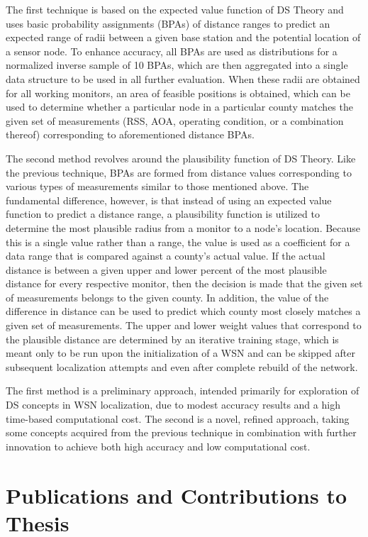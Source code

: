 \documentclass[12pt]{uthesis-v12}  %
\begin{document}
The first technique is based on the expected value function of DS Theory and uses basic probability assignments (BPAs) of distance ranges to predict an expected range of radii between a given base station and the potential location of a sensor node. To enhance accuracy, all BPAs are used as distributions for a normalized inverse sample of 10 BPAs, which are then aggregated into a single data structure to be used in all further evaluation. When these radii are obtained for all working monitors, an area of feasible positions is obtained, which can be used to determine whether a particular node in a particular county matches the given set of measurements (RSS, AOA, operating condition, or a combination thereof) corresponding to aforementioned distance BPAs.

The second method revolves around the plausibility function of DS Theory. Like the previous technique, BPAs are formed from distance values corresponding to various types of measurements similar to those mentioned above. The fundamental difference, however, is that instead of using an expected value function to predict a distance range, a plausibility function is utilized to determine the most plausible radius from a monitor to a node's location. Because this is a single value rather than a range, the value is used as a coefficient for a data range that is compared against a county's actual value. If the actual distance is between a given upper and lower percent of the most plausible distance for every respective monitor, then the decision is made that the given set of measurements belongs to the given county. In addition, the value of the difference in distance can be used to predict which county most closely matches a given set of measurements. The upper and lower weight values that correspond to the plausible distance are determined by an iterative training stage, which is meant only to be run upon the initialization of a WSN and can be skipped after subsequent localization attempts and even after complete rebuild of the network.

The first method is a preliminary approach, intended primarily for exploration of DS concepts in WSN localization, due to modest accuracy results and a high time-based computational cost. The second is a novel, refined approach, taking some concepts acquired from the previous technique in combination with further innovation to achieve both high accuracy and low computational cost. 

\section{Publications and Contributions to Thesis}
\end{document}
